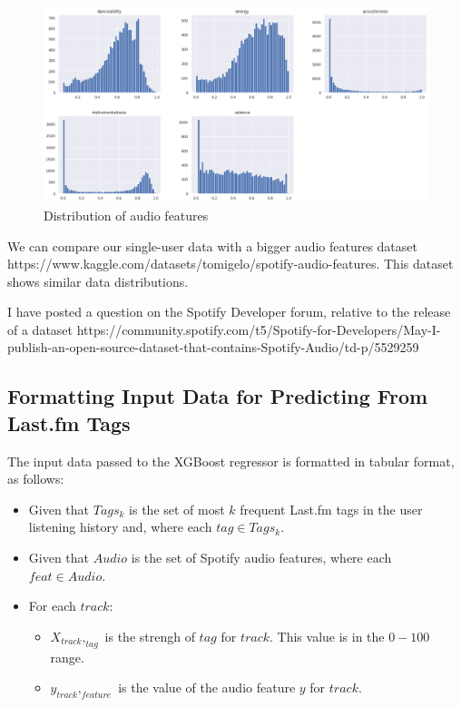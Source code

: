 \documentclass[sn-mathphys]{sn-jnl}%
\theoremstyle{thmstyleone}%
\theoremstyle{thmstyletwo}%
\theoremstyle{thmstylethree}%
\begin{document}
\begin{figure}[h!]
      \centering
      \includegraphics[width=\textwidth]{images/features-distribution.png}
      \caption{Distribution of audio features}
      \label{fig:audio_features_distribution}
\end{figure}

We can compare our single-user data with a bigger audio features dataset https://www.kaggle.com/datasets/tomigelo/spotify-audio-features.
This dataset shows similar data distributions.

I have posted a question on the Spotify Developer forum, relative to the release of a dataset
https://community.spotify.com/t5/Spotify-for-Developers/May-I-publish-an-open-source-dataset-that-contains-Spotify-Audio/td-p/5529259



\subsection{Formatting Input Data for Predicting From Last.fm Tags}

The input data passed to the XGBoost regressor is formatted in tabular format, as follows:

\begin{itemize}
      \item Given that $Tags_{k}$ is the set of most $k$ frequent Last.fm tags in the user listening history
            and, where each $tag \in Tags_{k}$.
      \item Given that $Audio$ is the set of Spotify audio features, where each $feat \in Audio$.
      \item For each $track$:
      \begin{itemize}
            \item $X_{track},_{tag}$ is the strengh of $tag$ for $track$. This value is in the $0-100$ range.
            \item $y_{track},_{feature}$ is the value of the audio feature $y$ for $track$.
      \end{itemize}
\end{itemize}
\end{document}
